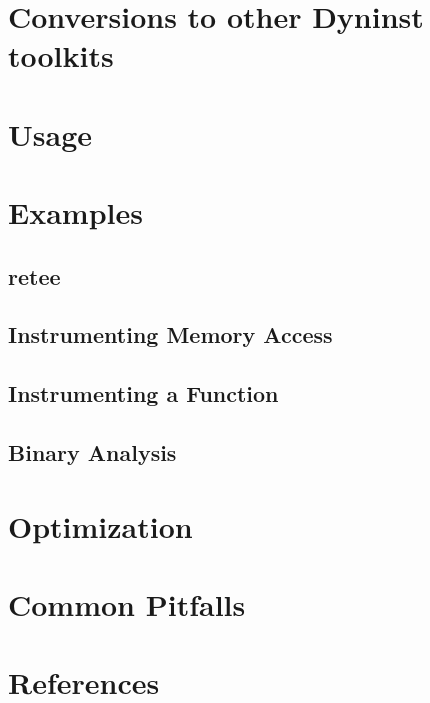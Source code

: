 \documentclass{article}
\begin{document}
\section{Conversions to other Dyninst toolkits}
\label{sec:conversions}
  

\section{Usage}
  

\section{Examples}
\label{sec:examples}
  \subsection{retee}
  \label{subsec:retee}
    

  \subsection{Instrumenting Memory Access}
    

  \subsection{Instrumenting a Function}
    

  \subsection{Binary Analysis}
    

\section{Optimization}
  

\section{Common Pitfalls}
  

\section{References}
  
\end{document}
